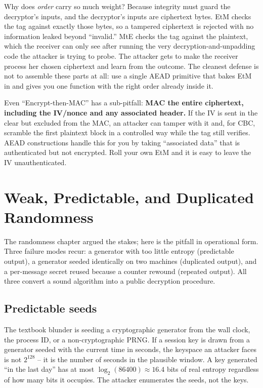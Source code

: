 \begin{whybox}
Why does \emph{order} carry so much weight? Because integrity must guard the decryptor's inputs, and the decryptor's inputs are ciphertext bytes. EtM checks the tag against exactly those bytes, so a tampered ciphertext is rejected with no information leaked beyond ``invalid.'' MtE checks the tag against the plaintext, which the receiver can only see after running the very decryption-and-unpadding code the attacker is trying to probe. The attacker gets to make the receiver process her chosen ciphertext and learn from the outcome. The cleanest defense is not to assemble these parts at all: use a single AEAD primitive that bakes EtM in and gives you one function with the right order already inside it.
\end{whybox}

\begin{trapbox}
Even ``Encrypt-then-MAC'' has a sub-pitfall: \textbf{MAC the entire ciphertext, including the IV/nonce and any associated header.} If the IV is sent in the clear but excluded from the MAC, an attacker can tamper with it and, for CBC, scramble the first plaintext block in a controlled way while the tag still verifies. AEAD constructions handle this for you by taking ``associated data'' that is authenticated but not encrypted. Roll your own EtM and it is easy to leave the IV unauthenticated.
\end{trapbox}

\section{Weak, Predictable, and Duplicated Randomness}
\label{ch38:randomness}

The randomness chapter argued the stakes; here is the pitfall in operational form. Three failure modes recur: a generator with too little entropy (predictable output), a generator seeded identically on two machines (duplicated output), and a per-message secret reused because a counter rewound (repeated output). All three convert a sound algorithm into a public decryption procedure.

\subsection{Predictable seeds}
\label{ch38:predictable-seed}

The textbook blunder is seeding a cryptographic generator from the wall clock, the process ID, or a non-cryptographic PRNG. If a session key is drawn from a generator seeded with the current time in seconds, the keyspace an attacker faces is not $2^{128}$ -- it is the number of seconds in the plausible window. A key generated ``in the last day'' has at most $\log_2(86400) \approx 16.4$ bits of real entropy regardless of how many bits it occupies. The attacker enumerates the seeds, not the keys.

